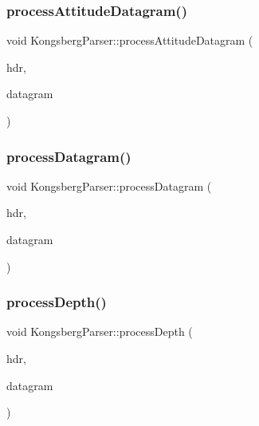 \subsubsection{\texorpdfstring{process\+Attitude\+Datagram()}{processAttitudeDatagram()}}
{\footnotesize\ttfamily void Kongsberg\+Parser\+::process\+Attitude\+Datagram (\begin{DoxyParamCaption}\item[{\hyperlink{structKongsbergHeader}{Kongsberg\+Header} \&}]{hdr,  }\item[{unsigned char $\ast$}]{datagram }\end{DoxyParamCaption})\hspace{0.3cm}{\ttfamily [private]}}

\mbox{\label{classKongsbergParser_a4d2236cb102afd4eef21687f5032e7fa}} 
\subsubsection{\texorpdfstring{process\+Datagram()}{processDatagram()}}
{\footnotesize\ttfamily void Kongsberg\+Parser\+::process\+Datagram (\begin{DoxyParamCaption}\item[{\hyperlink{structKongsbergHeader}{Kongsberg\+Header} \&}]{hdr,  }\item[{unsigned char $\ast$}]{datagram }\end{DoxyParamCaption})\hspace{0.3cm}{\ttfamily [private]}}

\mbox{\label{classKongsbergParser_a4ece0df376ad28782f7a59d2557b42df}} 
\subsubsection{\texorpdfstring{process\+Depth()}{processDepth()}}
{\footnotesize\ttfamily void Kongsberg\+Parser\+::process\+Depth (\begin{DoxyParamCaption}\item[{\hyperlink{structKongsbergHeader}{Kongsberg\+Header} \&}]{hdr,  }\item[{unsigned char $\ast$}]{datagram }\end{DoxyParamCaption})\hspace{0.3cm}{\ttfamily [private]}}

